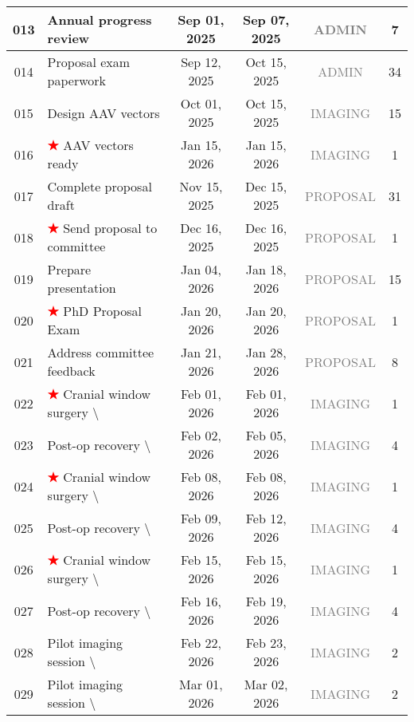 \documentclass[portrait,a4paper]{article}
\begin{document}
\begin{longtable}{|c|p{}|c|c|c|c|}
\hline
013 & Annual progress review & Sep 01, 2025 & Sep 07, 2025 & \textcolor{gray}{ADMIN} & 7 \\
\hline
014 & Proposal exam paperwork & Sep 12, 2025 & Oct 15, 2025 & \textcolor{gray}{ADMIN} & 34 \\
\hline
015 & Design AAV vectors & Oct 01, 2025 & Oct 15, 2025 & \textcolor{gray}{IMAGING} & 15 \\
\hline
016 & \textcolor{red}{\textbf{★}} AAV vectors ready & Jan 15, 2026 & Jan 15, 2026 & \textcolor{gray}{IMAGING} & 1 \\
\hline
017 & Complete proposal draft & Nov 15, 2025 & Dec 15, 2025 & \textcolor{gray}{PROPOSAL} & 31 \\
\hline
018 & \textcolor{red}{\textbf{★}} Send proposal to committee & Dec 16, 2025 & Dec 16, 2025 & \textcolor{gray}{PROPOSAL} & 1 \\
\hline
019 & Prepare presentation & Jan 04, 2026 & Jan 18, 2026 & \textcolor{gray}{PROPOSAL} & 15 \\
\hline
020 & \textcolor{red}{\textbf{★}} PhD Proposal Exam & Jan 20, 2026 & Jan 20, 2026 & \textcolor{gray}{PROPOSAL} & 1 \\
\hline
021 & Address committee feedback & Jan 21, 2026 & Jan 28, 2026 & \textcolor{gray}{PROPOSAL} & 8 \\
\hline
022 & \textcolor{red}{\textbf{★}} Cranial window surgery \textbackslash{}#1 & Feb 01, 2026 & Feb 01, 2026 & \textcolor{gray}{IMAGING} & 1 \\
\hline
023 & Post-op recovery \textbackslash{}#1 & Feb 02, 2026 & Feb 05, 2026 & \textcolor{gray}{IMAGING} & 4 \\
\hline
024 & \textcolor{red}{\textbf{★}} Cranial window surgery \textbackslash{}#2 & Feb 08, 2026 & Feb 08, 2026 & \textcolor{gray}{IMAGING} & 1 \\
\hline
025 & Post-op recovery \textbackslash{}#2 & Feb 09, 2026 & Feb 12, 2026 & \textcolor{gray}{IMAGING} & 4 \\
\hline
026 & \textcolor{red}{\textbf{★}} Cranial window surgery \textbackslash{}#3 & Feb 15, 2026 & Feb 15, 2026 & \textcolor{gray}{IMAGING} & 1 \\
\hline
027 & Post-op recovery \textbackslash{}#3 & Feb 16, 2026 & Feb 19, 2026 & \textcolor{gray}{IMAGING} & 4 \\
\hline
028 & Pilot imaging session \textbackslash{}#1 & Feb 22, 2026 & Feb 23, 2026 & \textcolor{gray}{IMAGING} & 2 \\
\hline
029 & Pilot imaging session \textbackslash{}#2 & Mar 01, 2026 & Mar 02, 2026 & \textcolor{gray}{IMAGING} & 2 \\

\end{longtable}
\end{document}
